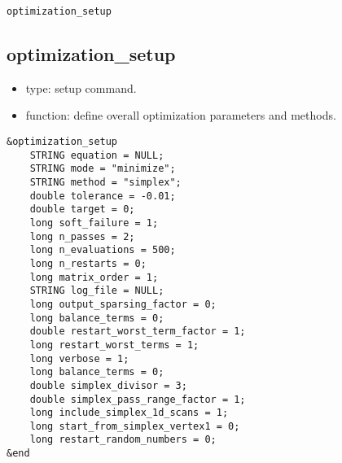 \documentclass[11pt]{article}
\begin{document}
\begin{latexonly}
\newpage
\begin{center}{\Large\verb|optimization_setup|}\end{center}
\end{latexonly}
\subsection{optimization\_setup \label{subsec:optimizationsetup}}

\begin{itemize}
\item type: setup command.
\item function: define overall optimization parameters and methods.
\end{itemize}

\begin{verbatim}
&optimization_setup
    STRING equation = NULL;
    STRING mode = "minimize";
    STRING method = "simplex";
    double tolerance = -0.01;
    double target = 0;
    long soft_failure = 1;
    long n_passes = 2;
    long n_evaluations = 500; 
    long n_restarts = 0;
    long matrix_order = 1;
    STRING log_file = NULL;
    long output_sparsing_factor = 0;
    long balance_terms = 0;
    double restart_worst_term_factor = 1;
    long restart_worst_terms = 1;
    long verbose = 1;
    long balance_terms = 0;
    double simplex_divisor = 3;
    double simplex_pass_range_factor = 1;
    long include_simplex_1d_scans = 1;
    long start_from_simplex_vertex1 = 0;
    long restart_random_numbers = 0;
&end
\end{verbatim}
\end{document}
